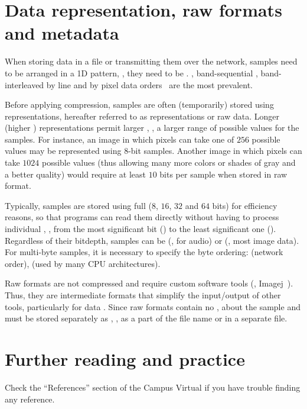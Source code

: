 \section{Data representation, raw formats and metadata}

When storing data in a file or transmitting them over the network,
samples need to be arranged in a 1D pattern, \ie, they need to be .
,
band-sequential , band-interleaved by line  and by pixel 
data orders~\cite{collins_understanding_rasters,loc_bsq,loc_bil,loc_bip} are the most prevalent.

Before applying compression, samples are often (temporarily) stored using  representations,
hereafter referred to as  representations or raw data.
%
Longer (higher ) representations permit
larger , \ie, a larger range of possible
values for the samples.
%
For instance, an image in which pixels can take one of $256$ possible values may
be represented using $8$-bit samples. Another image in which pixels can take $1024$ possible values
(thus allowing many more colors or shades of gray and a better quality)
would require at least $10$ bits per sample when stored in raw format.

Typically, samples are stored using full  ($8$, $16$, $32$ and $64$ bits)
for efficiency reasons,
so that programs can read them directly without having to process individual ,
\eg, from the most significant bit () to the least significant one ().
%
Regardless of their bitdepth, samples can be  (\eg, for audio) or 
(\eg, most image data).
%
For multi-byte samples, it is necessary to specify the byte ordering:
 (\aka network order),  (used by many CPU architectures).

Raw formats are not compressed and require custom software tools (\eg, Imagej~\cite{rasband_imagej}).
Thus, they are intermediate formats that simplify the input/output of other tools, particularly
for data . Since raw formats contain no ,
 about the sample  and  must be stored separately as
, \eg, as a part of the file name or in a separate file.


\section*{Further reading and practice}
\vspace{0.25cm}
\begin{remark}
    Check the ``References'' section of the Campus Virtual if you have trouble finding any reference.
\end{remark}

